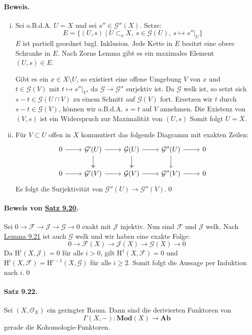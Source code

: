 \paragraph{Beweis.}
\begin{enumerate}[(i)]
\item Sei o.B.d.A. $U=X$ und sei $s''\in\mathcal{G}''(X)$. Setze:
\[E=\{(U,s)\mid U\subset_\text{o}X,\ s\in\mathcal{G}(U),\ s\mapsto s''|_U \} \]
$E$ ist partiell geordnet bzgl. Inklusion. Jede Kette in $E$ besitzt eine obere Schranke in $E$. Nach Zorns Lemma gibt es ein maximales Element $(U,s)\in E$.

Gibt es ein $x\in X\setminus U$, so existiert eine offene Umgebung $V$ von $x$ und $t\in\mathcal{G}(V)$ mit $t\mapsto s''|_V$, da $\mathcal{G}\to\mathcal{G}''$ surjektiv ist. Da $\mathcal{G}$ welk ist, so setzt sich $s-t\in\mathcal{G}(U\cap V)$ zu einem Schnitt auf $\mathcal{G}(V)$ fort. Ersetzen wir $t$ durch $s-t\in\mathcal{G}(V)$, können wir o.B.d.A. $s=t$ auf $V$ annehmen. Die Existenz von $(V,s)$ ist ein Widerspruch zur Maximalität von $(U,s)$ Somit folgt $U=X$.
\item Für $V\subset U$ offen in $X$ kommutiert das folgende Diagramm mit exakten Zeilen:
\[\begin{tikzcd}
0 \rar & \mathcal{G}'(U)\rar\dar[two heads] & \mathcal{G}(U)\rar\dar[two heads] & \mathcal{G}''(U)\rar\dar & 0\\
0 \rar & \mathcal{G}'(V)\rar & \mathcal{G}(V)\rar & \mathcal{G}''(V)\rar & 0
\end{tikzcd} \]
Es folgt die Surjektivität von $\mathcal{G}''(U)\to\mathcal{G}''(V)$.\qed
\end{enumerate}

\paragraph{Beweis von \hyperref[9.20]{Satz 9.20}.} Sei $0\to\mathcal{F}\to\mathcal{J}\to\mathcal{G}\to 0$ exakt mit $\mathcal{J}$ injektiv. Nun sind $\mathcal{F}$ und $\mathcal{J}$ welk. Nach \hyperref[9.21]{Lemma 9.21} ist auch $\mathcal{G}$ welk und wir haben eine exakte Folge:
\[0\longrightarrow\mathcal{F}(X)\longrightarrow\mathcal{J}(X)\longrightarrow\mathcal{G}(X)\longrightarrow 0 \]
Da $\mathrm{H}^i(X,\mathcal{J})=0$ für alle $i>0$, gilt $\mathrm{H}^1(X,\mathcal{F})=0$ und $\mathrm{H}^i(X,\mathcal{F})=\mathrm{H}^{i-1}(X,\mathcal{G})$ für alle $i\geq 2$. Somit folgt die Aussage per Induktion nach $i$.\qed

\paragraph{Satz 9.22.}\label{9.22} Sei $(X,\mathcal{O}_X)$ ein geringter Raum. Dann sind die derivierten Funktoren von
\[\Gamma(X,-): \mathbf{Mod}(X)\to\mathbf{Ab} \]
gerade die Kohomologie-Funktoren.

